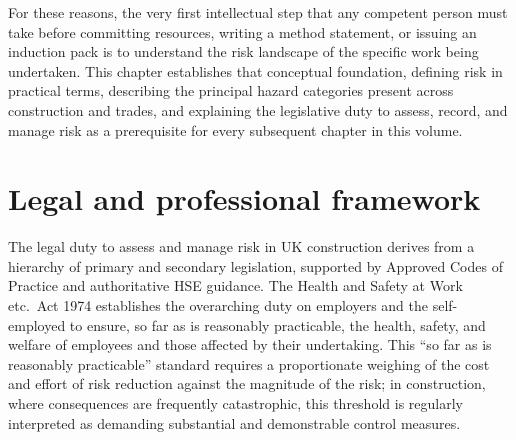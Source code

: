 For these reasons, the very first intellectual step that any competent person must take before committing resources, writing a method statement, or issuing an induction pack is to understand the risk landscape of the specific work being undertaken. This chapter establishes that conceptual foundation, defining risk in practical terms, describing the principal hazard categories present across construction and trades, and explaining the legislative duty to assess, record, and manage risk as a prerequisite for every subsequent chapter in this volume.



\section{Legal and professional framework}

The legal duty to assess and manage risk in UK construction derives from a hierarchy of primary and secondary legislation, supported by Approved Codes of Practice and authoritative HSE guidance. The Health and Safety at Work etc.\ Act 1974 establishes the overarching duty on employers and the self-employed to ensure, so far as is reasonably practicable, the health, safety, and welfare of employees and those affected by their undertaking. This ``so far as is reasonably practicable'' standard requires a proportionate weighing of the cost and effort of risk reduction against the magnitude of the risk; in construction, where consequences are frequently catastrophic, this threshold is regularly interpreted as demanding substantial and demonstrable control measures.


